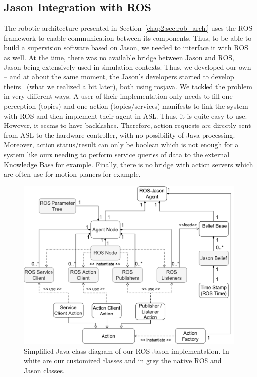 \documentclass[a4paper,11pt,twoside]{StyleThese}
\begin{document}
\subsection{Jason Integration with ROS}
The robotic architecture presented in Section~\ref{chap2:sec:rob_archi} uses the ROS framework\cite{quigley_2009_ros} to enable communication between its components. Thus, to be able to build a supervision software based on Jason, we needed to interface it with ROS as well. At the time, there was no available bridge between Jason and ROS, Jason being extensively used in simulation contexts. Thus, we developed our own -- and at about the same moment, the Jason's developers started to develop theirs~\cite{silva_2020_embedded} (what we realized a bit later), both using rosjava. We tackled the problem in very different ways. A user of their implementation only needs to fill one perception (topics) and one action (topics/services) manifests to link the system with ROS and then implement their agent in ASL. Thus, it is quite easy to use. However, it seems to have backlashes. Therefore, action requests are directly sent from ASL to the hardware controller, with no possibility of Java processing. Moreover, action status/result can only be boolean which is not enough for a system like ours needing to perform service queries of data to the external Knowledge Base for example. Finally, there is no bridge with action servers which are often use for motion planers for example. 

\begin{figure}[!ht]
	\includegraphics[width=\linewidth]{figures/chapter2/RJS_diagram.pdf}
	\caption{Simplified Java class diagram of our ROS-Jason implementation. In white are our customized classes and in grey the native ROS and Jason classes.}
	\label{chap2:fig:rjs}
\end{figure}
\end{document}
